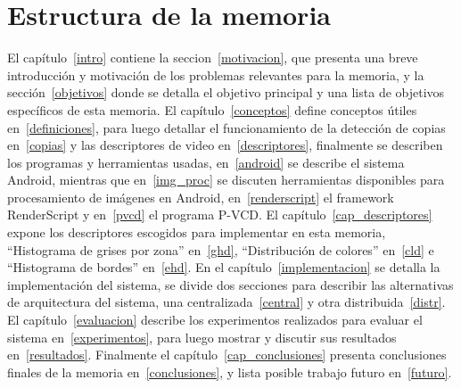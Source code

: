 \section{Estructura de la memoria}
El capítulo~\ref{intro} contiene la seccion~\ref{motivacion}, que presenta una breve introducción y motivación de los problemas relevantes para la memoria, y la sección~\ref{objetivos} donde se detalla el objetivo principal y una lista de objetivos específicos de esta memoria.
El capítulo~\ref{conceptos} define conceptos útiles en~\ref{definiciones}, para luego detallar el funcionamiento de la detección de copias en~\ref{copias} y las descriptores de video en~\ref{descriptores}, finalmente se describen los programas y herramientas usadas, en~\ref{android} se describe el sistema Android, mientras que en~\ref{img_proc} se discuten herramientas disponibles para procesamiento de imágenes en Android, en~\ref{renderscript} el framework RenderScript y en~\ref{pvcd} el programa P-VCD.
El capítulo~\ref{cap_descriptores} expone los descriptores escogidos para implementar en esta memoria, ``Histograma de grises por zona'' en~\ref{ghd}, ``Distribución de colores'' en~\ref{cld} e ``Histograma de bordes'' en~\ref{ehd}.
En el capítulo~\ref{implementacion} se detalla la implementación del sistema, se divide dos secciones para describir las alternativas de arquitectura del sistema, una centralizada~\ref{central} y otra distribuida~\ref{distr}.
El capítulo~\ref{evaluacion} describe los experimentos realizados para evaluar el sistema en~\ref{experimentos}, para luego mostrar y discutir sus resultados en~\ref{resultados}.
Finalmente el capítulo~\ref{cap_conclusiones} presenta conclusiones finales de la memoria en~\ref{conclusiones}, y lista posible trabajo futuro en~\ref{futuro}.

